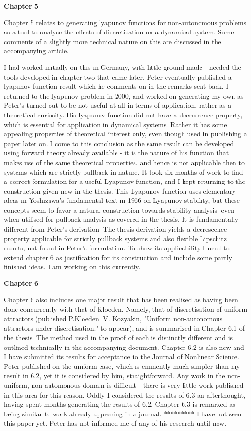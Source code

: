 \documentclass{article}
\begin{document}
 \textbf{Chapter 5}

Chapter 5 relates to generating lyapunov functions for
non-autonomous problems as a tool to analyse the effects of
discretisation on a dynamical system. Some comments of a slightly
more technical nature on this are discussed in the accompanying
article.

I had worked initially on this in Germany, with little ground made
- needed the tools developed in chapter two that came later. Peter
eventually published a lyapunov function result which he comments
on in the remarks sent back. I returned to the lyapunov problem in
2000, and worked on generating my own as Peter's turned out to be
not useful at all in terms of application, rather as a theoretical
curiosity. His lyapunov function did not have a decrescence
property, which is essential for application in dynamical systems.
Rather it has some appealing properties of theoretical interest
only, even though used in publishing a paper later on. I come to
this conclusion as the same result can be developed using forward
theory already available - it is the nature of his function that
makes use of the same theoretical properties, and hence is not
applicable then to systems which are strictly pullback in nature.
It took six months of work to find a correct formulation for a
useful Lyapunov function, and I kept returning to the construction
given now in the thesis. This Lyapunov function uses elementary
ideas in Yoshizawa's fundamental text in 1966 on Lyapunov
stability, but these concepts seem to favor a natural construction
towards stability analysis, even when utilised for pullback
analysis as covered in the thesis. It is fundamentally different
from Peter's derivation. The thesis derivation yields a
decrescence property applicable for strictly pullback systems and
also flexible Lipschitz results, not found in Peter's formulation.
To show its applicability I need to extend chapter 6 as
justification for its construction and include some partly
finished ideas. I am working on this currently.

\textbf{Chapter 6}

Chapter 6 also includes one major result that has been realised as
having been done concurrently with that of Kloeden. Namely, that
of discretisation of uniform attractors (published P.Kloeden, V.
Kozyakin, "Uniform non-autonomous attractors under
discretisation." to appear), and is summarized in Chapter 6.1 of
the thesis. The method used in the proof of each is distinctly
different and is outlined technically in the accompanying
document. Chapter 6.2 is also new and I have submitted its results
for acceptance to the Journal of Nonlinear Science. Peter
published on the uniform case, which is eminently much simpler
than my result in 6.2, yet it is considered by him,
straightforward. Any work in the non-uniform, non-automonous
domain is difficult - there is very little work published in this
area for this reason. Oddly I considered the results of 6.3 an
afterthought, having spent months generating the results of 6.2.
Chapter 6.3 is remarked as being similar to work already appearing
in a journal. ********* I have not seen this paper yet. Peter has
not informed me of any of his research until now.
\end{document}
